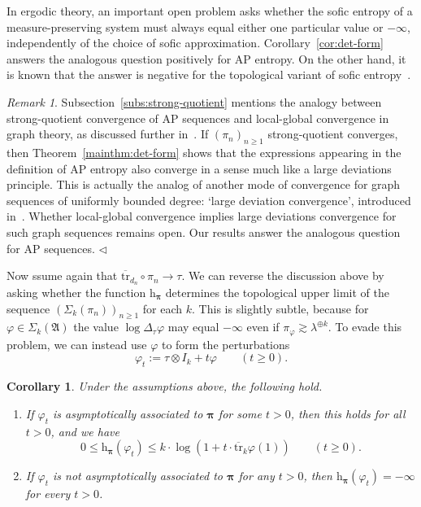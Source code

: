 \documentclass[12pt,a4paper]{article}
\numberwithin{equation}{section}
\newtheorem{cor}[thm]{Corollary}
\theoremstyle{remark}
\newtheorem{rmk}[thm]{Remark}
\newcommand{\rmh}{\mathrm{h}}
\newcommand{\A}{\mathfrak{A}}
\renewcommand{\S}{\Sigma}
\renewcommand{\phi}{\varphi}
\renewcommand{\l}{\lambda}
\newcommand{\fin}{\nolinebreak\hspace{\stretch{1}}$\lhd$}
\newcommand{\bspi}{\boldsymbol{\pi}}
\newcommand{\tr}{\overline{\mathrm{tr}}}
\begin{document}
In ergodic theory, an important open problem asks whether the sofic entropy of a measure-preserving system must always equal either one particular value or $-\infty$, independently of the choice of sofic approximation.  Corollary~\ref{cor:det-form} answers the analogous question positively for AP entropy.  On the other hand, it is known that the answer is negative for the topological variant of sofic entropy~\cite{AirBowLin22}.

\begin{rmk}\label{rmk:LD-conv}
Subsection~\ref{subs:strong-quotient} mentions the analogy between strong-quotient convergence of AP sequences and local-global convergence in graph theory, as discussed further in~\cite{AbeEle11}.  If $(\pi_n)_{n\ge 1}$ strong-quotient converges, then Theorem~\ref{mainthm:det-form} shows that the expressions appearing in the definition of AP entropy also converge in a sense much like a large deviations principle.  This is actually the analog of another mode of convergence for graph sequences of uniformly bounded degree: `large deviation convergence', introduced in~\cite{BorChaGam17}.  Whether local-global convergence implies large deviations convergence for such graph sequences remains open.  Our results answer the analogous question for AP sequences. \fin
\end{rmk}

Now ssume again that $\tr_{d_n}\circ \pi_n \to \tau$.  We can reverse the discussion above by asking whether the function $\rmh_{\bspi}$ determines the topological upper limit of the sequence $(\S_k(\pi_n))_{n\ge 1}$ for each $k$.  This is slightly subtle, because for $\phi \in \S_k(\A)$ the value $\log \Delta_\tau \phi$ may equal $-\infty$ even if $\pi_\phi \gtrsim \l^{\oplus k}$.  To evade this problem, we can instead use $\phi$ to form the perturbations
\[\phi_t := \tau\otimes I_k + t\phi \qquad (t\ge 0).\]

\begin{cor}\label{cor:mollify}
Under the assumptions above, the following hold.
\begin{enumerate}
\item[a.] If $\phi_t$ is asymptotically associated to $\bspi$ for some $t  > 0$, then this holds for all $t > 0$, and we have
\[0 \le \rmh_{\bspi}(\phi_t) \le k\cdot \log (1 + t\cdot \tr_k \phi(1)) \qquad (t \ge 0).\]
\item[b.] If $\phi_t$ is not asymptotically associated to $\bspi$ for any $t > 0$, then $\rmh_{\bspi}(\phi_t) = -\infty$ for every $t > 0$.
\end{enumerate}
\end{cor}
\end{document}
